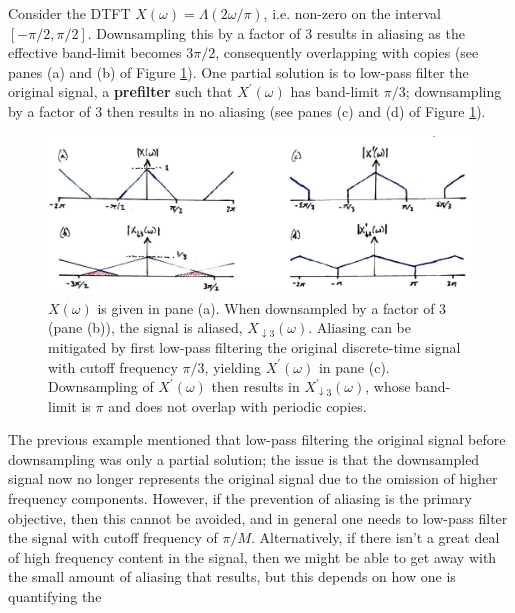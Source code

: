 \begin{exmp}
  Consider the DTFT $X(\omega) = \Lambda(2\omega/\pi)$, i.e. non-zero on the interval
  $[-\pi/2,\pi/2]$. Downsampling this by a factor of 3 results in aliasing as the
  effective band-limit becomes $3\pi/2$, consequently overlapping with copies
  (see panes (a) and (b) of Figure \ref{fig::lecture_14_triangle_example}).
  One partial solution is to low-pass filter
  the original signal, a \textbf{prefilter} such that $X^\prime(\omega)$ has band-limit
  $\pi/3$; downsampling by a factor of 3 then results in no aliasing (see panes (c) and
  (d) of Figure \ref{fig::lecture_14_triangle_example}).
  \begin{figure}[!htb]
    \includegraphics[width=\textwidth]{images/lecture_14_triangle_example.JPG}
    \caption{$X(\omega)$ is given in pane (a). When downsampled by a factor of
      3 (pane (b)), the signal is aliased, $X_{\downarrow 3}(\omega)$. Aliasing
      can be mitigated by first low-pass filtering the original discrete-time
      signal with cutoff frequency $\pi/3$, yielding $X^\prime(\omega)$ in
      pane (c). Downsampling of $X^\prime(\omega)$ then results in
      $X^\prime_{\downarrow 3}(\omega)$, whose band-limit is $\pi$ and does
      not overlap with periodic copies.
    }
    \label{fig::lecture_14_triangle_example}
  \end{figure}
\end{exmp}
%
The previous example mentioned that low-pass filtering the original signal before
downsampling was only a partial solution; the issue is that the downsampled signal
now no longer represents the original signal due to the omission of higher frequency
components. However, if the prevention of aliasing is the primary objective, then this
cannot be avoided, and in general one needs to low-pass filter the signal with
cutoff frequency of $\pi/M$. Alternatively, if there isn't a great deal of high
frequency content in the signal, then we might be able to get away with the small
amount of aliasing that results, but this depends on how one is quantifying the
